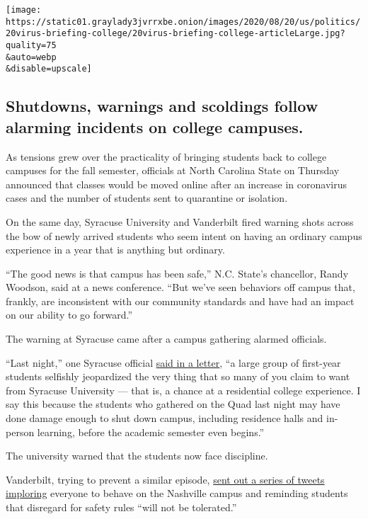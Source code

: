 \texttt{[image: https://static01.graylady3jvrrxbe.onion/images/2020/08/20/us/politics/20virus-briefing-college/20virus-briefing-college-articleLarge.jpg?quality=75\\\&auto=webp\\\&disable=upscale]}

\hypertarget{shutdowns-warnings-and-scoldings-follow-alarming-incidents-on-college-campuses}{%
\subsection{Shutdowns, warnings and scoldings follow alarming incidents
on college
campuses.}\label{shutdowns-warnings-and-scoldings-follow-alarming-incidents-on-college-campuses}}

As tensions grew over the practicality of bringing students back to
college campuses for the fall semester, officials at North Carolina
State on Thursday announced that classes would be moved online after an
increase in coronavirus cases and the number of students sent to
quarantine or isolation.

On the same day, Syracuse University and Vanderbilt fired warning shots
across the bow of newly arrived students who seem intent on having an
ordinary campus experience in a year that is anything but ordinary.

``The good news is that campus has been safe,'' N.C. State's chancellor,
Randy Woodson, said at a news conference. ``But we've seen behaviors off
campus that, frankly, are inconsistent with our community standards and
have had an impact on our ability to go forward.''

The warning at Syracuse came after a campus gathering alarmed officials.

``Last night,'' one Syracuse official
\href{https://news.syr.edu/blog/2020/08/20/last-nights-selfish-and-reckless-behavior/}{said
in a letter}, ``a large group of first-year students selfishly
jeopardized the very thing that so many of you claim to want from
Syracuse University --- that is, a chance at a residential college
experience. I say this because the students who gathered on the Quad
last night may have done damage enough to shut down campus, including
residence halls and in-person learning, before the academic semester
even begins.''

The university warned that the students now face discipline.

Vanderbilt, trying to prevent a similar episode,
\href{https://pbs.twimg.com/media/Ef0EqwwXsAALIho.png}{sent out a series
of tweets imploring} everyone to behave on the Nashville campus and
reminding students that disregard for safety rules ``will not be
tolerated.''

